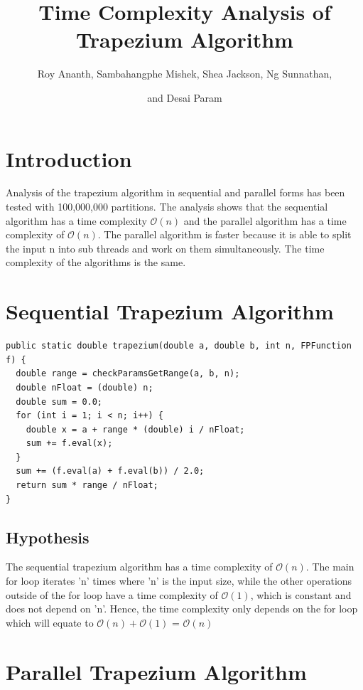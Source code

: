 \documentclass[12pt]{article}
\title{Time Complexity Analysis of Trapezium Algorithm}
\author{Roy Ananth, Sambahangphe Mishek, Shea Jackson, Ng Sunnathan,\and and Desai Param}
\begin{document}
\maketitle
\newpage
\section{Introduction}

Analysis of the trapezium algorithm in sequential and parallel forms has been tested with 100,000,000 partitions. The analysis shows that the sequential algorithm has a time complexity $\mathcal{O}(n)$ and the parallel algorithm has a time complexity of $\mathcal{O}(n)$. The parallel algorithm is faster because it is able to split the input n into sub threads and work on them simultaneously. The time complexity of the algorithms is the same. 

\section{Sequential Trapezium Algorithm}

\begin{verbatim} 
public static double trapezium(double a, double b, int n, FPFunction f) {
  double range = checkParamsGetRange(a, b, n);
  double nFloat = (double) n;
  double sum = 0.0;
  for (int i = 1; i < n; i++) {
    double x = a + range * (double) i / nFloat;
    sum += f.eval(x);
  }
  sum += (f.eval(a) + f.eval(b)) / 2.0;
  return sum * range / nFloat;
}
\end{verbatim}


\subsection{Hypothesis}
The sequential trapezium algorithm has a time complexity of $ \mathcal{O}(n)$. The main for loop iterates 'n' times where 'n' is the input size, while the other operations outside of the for loop have a time complexity of $\mathcal{O}(1) $, which is constant and does not depend on 'n'. Hence, the time complexity only depends on the for loop which will equate to $\mathcal{O}(n) + \mathcal{O}(1)$  = $\mathcal{O}(n)$ 




\newpage

\section{Parallel Trapezium Algorithm}
\end{document}
